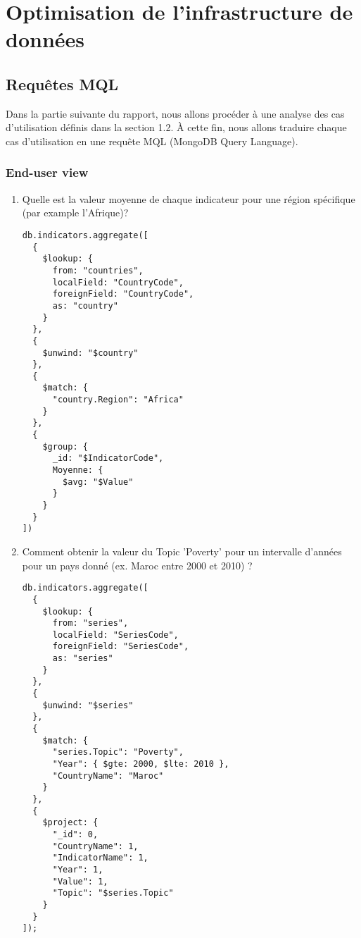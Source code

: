 \section{Optimisation de l'infrastructure de données}
\subsection{Requêtes MQL}
Dans la partie suivante du rapport, nous allons procéder à une analyse des cas d'utilisation définis dans la section 1.2. À cette fin, nous allons traduire chaque cas d'utilisation en une requête MQL (MongoDB Query Language).
\subsubsection{End-user view}
\begin{enumerate}
   \item Quelle est la valeur moyenne de chaque indicateur pour une région spécifique (par example l’Afrique)? 
   
\begin{lstlisting}
db.indicators.aggregate([
  {
    $lookup: {
      from: "countries",
      localField: "CountryCode",
      foreignField: "CountryCode",
      as: "country"
    }
  },
  {
    $unwind: "$country"
  },
  {
    $match: {
      "country.Region": "Africa"
    }
  },
  {
    $group: {
      _id: "$IndicatorCode",
      Moyenne: {
        $avg: "$Value"
      }
    }
  }
])
\end{lstlisting}
    \item Comment obtenir la valeur du Topic ’Poverty’ pour un intervalle d’années pour un pays donné (ex. Maroc entre 2000 et 2010)  ?

\begin{lstlisting}
db.indicators.aggregate([
  {
    $lookup: {
      from: "series",
      localField: "SeriesCode",
      foreignField: "SeriesCode",
      as: "series"
    }
  },
  {
    $unwind: "$series"
  },
  {
    $match: {
      "series.Topic": "Poverty",
      "Year": { $gte: 2000, $lte: 2010 },
      "CountryName": "Maroc"
    }
  },
  {
    $project: {
      "_id": 0,
      "CountryName": 1,
      "IndicatorName": 1,
      "Year": 1,
      "Value": 1,
      "Topic": "$series.Topic"
    }
  }
]);

\end{lstlisting}



\end{enumerate}
